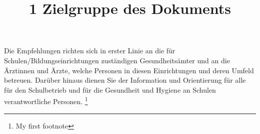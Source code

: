 \documentclass{article}
\begin{document}
\title{1 Zielgruppe des Dokuments}

\maketitle


Die Empfehlungen richten sich in erster Linie an die für Schulen/Bildungseinrichtungen zuständigen Gesundheitsämter und an die Ärztinnen und Ärzte, welche Personen in diesen Einrichtungen und deren Umfeld betreuen. Darüber hinaus dienen Sie der Information und Orientierung für alle für den Schulbetrieb und für die Gesundheit und Hygiene an Schulen verantwortliche Personen.\autocite{RobertKoch-Institut20200120} \footnote{My first footnote}





\printbibliography[title={Literaturverzeichnis}]
\end{document}
